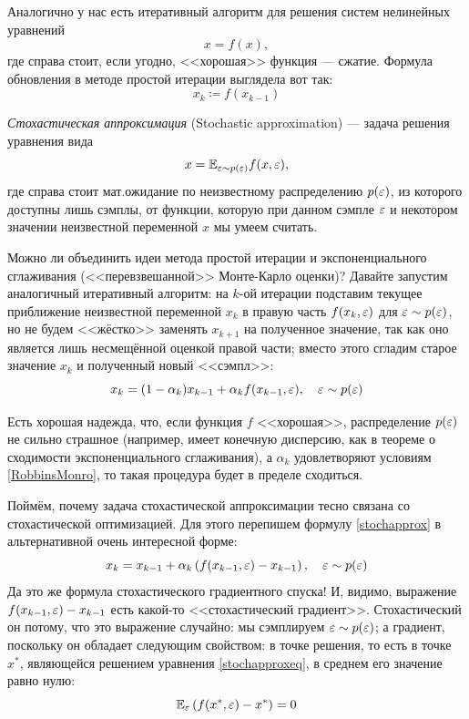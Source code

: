 Аналогично у нас есть итеративный алгоритм для решения систем нелинейных уравнений
$$x = f(x),$$
где справа стоит, если угодно, <<хорошая>> функция --- сжатие. Формула обновления в методе простой итерации выглядела вот так:
$$x_k \coloneqq f(x_{k-1})$$

\begin{definition}
\emph{Стохастическая аппроксимация} (Stochastic approximation) --- задача решения уравнения вида
\begin{equation}\label{stochapproxeq}
x = \mathbb{E}_{\varepsilon \sim p(\varepsilon)} f(x, \varepsilon),
\end{equation}
где справа стоит мат.ожидание по неизвестному распределению $p(\varepsilon)$, из которого доступны лишь сэмплы, от функции, которую при данном сэмпле $\varepsilon$ и некотором значении неизвестной переменной $x$ мы умеем считать. 
\end{definition}

Можно ли объединить идеи метода простой итерации и экспоненциального сглаживания (<<перевзвешанной>> Монте-Карло оценки)? Давайте запустим аналогичный итеративный алгоритм: на $k$-ой итерации подставим текущее приближение неизвестной переменной $x_k$ в правую часть $f(x_k, \varepsilon)$ для $\eps \HM\sim p(\eps)$, но не будем <<жёстко>> заменять $x_{k+1}$ на полученное значение, так как оно является лишь несмещённой оценкой правой части; вместо этого сгладим старое значение $x_k$ и полученный новый <<сэмпл>>:
\begin{equation}\label{stochapprox}
x_k = (1 - \alpha_k)x_{k-1} + \alpha_k f(x_{k-1}, \varepsilon), \quad \varepsilon \sim p(\varepsilon)
\end{equation}

Есть хорошая надежда, что, если функция $f$ <<хорошая>>, распределение $p(\varepsilon)$ не сильно страшное (например, имеет конечную дисперсию, как в теореме о сходимости экспоненциального сглаживания), а $\alpha_k$ удовлетворяют условиям \eqref{RobbinsMonro}, то такая процедура будет в пределе сходиться.

Поймём, почему задача стохастической аппроксимации тесно связана со стохастической оптимизацией. Для этого перепишем формулу \eqref{stochapprox} в альтернативной очень интересной форме:
\begin{equation}\label{stochapproxgrad}
x_k = x_{k-1} + \alpha_k \left( f(x_{k-1}, \varepsilon) - x_{k-1} \right), \quad \varepsilon \sim p(\varepsilon)
\end{equation}
Да это же формула стохастического градиентного спуска! И, видимо, выражение $f(x_{k-1}, \eps) \HM- x_{k-1}$ есть какой-то <<стохастический градиент>>. Стохастический он потому, что это выражение случайно: мы сэмплируем $\varepsilon \sim p(\varepsilon)$; а градиент, поскольку он обладает следующим свойством: в точке решения, то есть в точке $x^*$, являющейся решением уравнения \eqref{stochapproxeq}, в среднем его значение равно нулю: 
$$\mathbb{E}_{\varepsilon} \left( f(x^*, \varepsilon) - x^* \right) = 0$$

